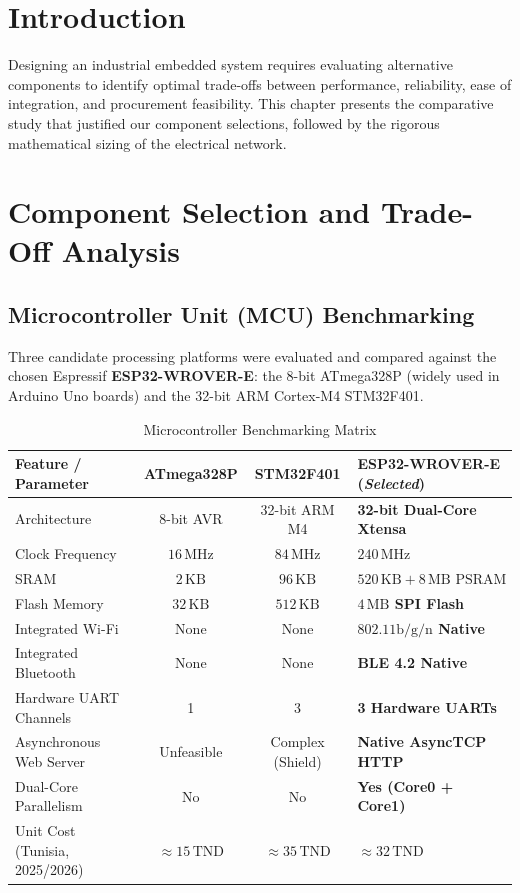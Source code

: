 \documentclass[12pt,a4paper,oneside]{report}
\begin{document}
\section{Introduction}
Designing an industrial embedded system requires evaluating alternative components to identify optimal trade-offs between performance, reliability, ease of integration, and procurement feasibility. This chapter presents the comparative study that justified our component selections, followed by the rigorous mathematical sizing of the electrical network.

\section{Component Selection and Trade-Off Analysis}

\subsection{Microcontroller Unit (MCU) Benchmarking}
Three candidate processing platforms were evaluated and compared against the chosen Espressif \textbf{ESP32-WROVER-E}: the 8-bit ATmega328P (widely used in Arduino Uno boards) and the 32-bit ARM Cortex-M4 STM32F401.

\begin{table}[H]
\centering
\small
\caption{Microcontroller Benchmarking Matrix}
\label{tab:mcu_comparison}
\begin{tabularx}{\textwidth}{>{\raggedright\arraybackslash}X c c >{\raggedright\arraybackslash}p{3.8cm}}
\toprule
\textbf{Feature / Parameter} & \textbf{ATmega328P} & \textbf{STM32F401} & \textbf{ESP32-WROVER-E} (\textit{Selected}) \\
\midrule
Architecture & 8-bit AVR & 32-bit ARM M4 & \textbf{32-bit Dual-Core Xtensa} \\
Clock Frequency & $16\,\text{MHz}$ & $84\,\text{MHz}$ & \textbf{$240\,\text{MHz}$} \\
SRAM & $2\,\text{KB}$ & $96\,\text{KB}$ & \textbf{$520\,\text{KB} + 8\,\text{MB PSRAM}$} \\
Flash Memory & $32\,\text{KB}$ & $512\,\text{KB}$ & \textbf{$4\,\text{MB}$ SPI Flash} \\
Integrated Wi-Fi & None & None & \textbf{$802.11\text{b/g/n}$ Native} \\
Integrated Bluetooth & None & None & \textbf{BLE 4.2 Native} \\
Hardware UART Channels & 1 & 3 & \textbf{3 Hardware UARTs} \\
Asynchronous Web Server & Unfeasible & Complex (Shield) & \textbf{Native AsyncTCP HTTP} \\
Dual-Core Parallelism & No & No & \textbf{Yes (Core0 + Core1)} \\
Unit Cost (Tunisia, 2025/2026) & $\approx 15\,\text{TND}$ & $\approx 35\,\text{TND}$ & \textbf{$\approx 32\,\text{TND}$} \\
\bottomrule
\end{tabularx}
\end{table}
\end{document}
